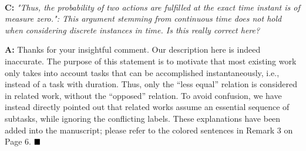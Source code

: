 \documentclass[10pt]{article}
\begin{document}
\hspace*{\fill} \


\textbf{C:}
\emph{"Thus, the probability of two actions are fulfilled at the exact time instant is of measure
	zero.": This argument stemming from continuous time does not hold when considering
	discrete instances in time. Is this really correct here?
}

\textbf{A:} Thanks for your insightful comment. Our description
here is indeed inaccurate.
The purpose of this statement is to motivate that most existing work only takes into account tasks that can be accomplished instantaneously,
i.e., instead of a task with duration.
Thus, only the ``less equal'' relation is considered in related work,
without the ``opposed''  relation.
To avoid confusion, we have instead directly pointed out that related works assume an essential sequence of subtasks,
while ignoring the conflicting labels.
These explanations have been added into the manuscript; please refer to the colored sentences in Remark 3  on Page 6.
$\hfill\blacksquare$

\hspace*{\fill} \

\end{document}

